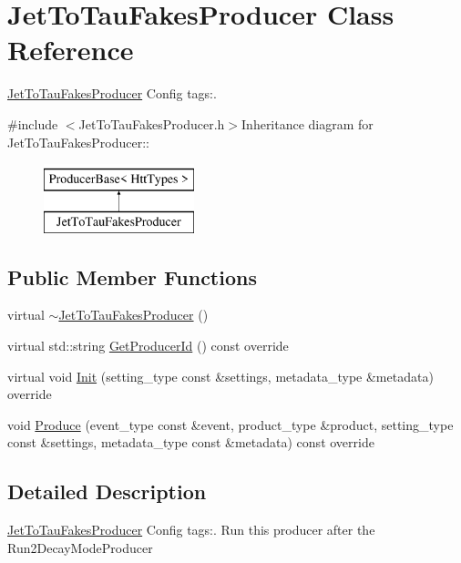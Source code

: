\hypertarget{classJetToTauFakesProducer}{
\section{JetToTauFakesProducer Class Reference}
\label{classJetToTauFakesProducer}
}


\hyperlink{classJetToTauFakesProducer}{JetToTauFakesProducer} Config tags:.  


{\ttfamily \#include $<$JetToTauFakesProducer.h$>$}Inheritance diagram for JetToTauFakesProducer::\begin{figure}[H]
\begin{center}
\leavevmode
\includegraphics[height=2cm]{classJetToTauFakesProducer}
\end{center}
\end{figure}
\subsection*{Public Member Functions}
\begin{DoxyCompactItemize}
\item 
virtual \hyperlink{classJetToTauFakesProducer_aaa7230e62295af44eaa2abcfa30dd1f7}{$\sim$JetToTauFakesProducer} ()
\item 
virtual std::string \hyperlink{classJetToTauFakesProducer_ae37ef82941c16b6b9dd5d8877c3da52e}{GetProducerId} () const override
\item 
virtual void \hyperlink{classJetToTauFakesProducer_aee845c60005d5f266e75223e7ba48d0d}{Init} (setting\_\-type const \&settings, metadata\_\-type \&metadata) override
\item 
void \hyperlink{classJetToTauFakesProducer_a15c8ffdd745fe71abbf163536b8b231e}{Produce} (event\_\-type const \&event, product\_\-type \&product, setting\_\-type const \&settings, metadata\_\-type const \&metadata) const override
\end{DoxyCompactItemize}


\subsection{Detailed Description}
\hyperlink{classJetToTauFakesProducer}{JetToTauFakesProducer} Config tags:. Run this producer after the Run2DecayModeProducer 

